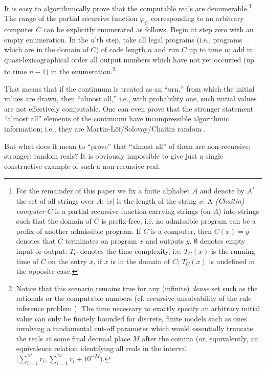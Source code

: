 It is easy to algorithmically prove that the computable reals
are denumerable.\footnote{
For the remainder of this paper we fix a finite
alphabet $A$ and denote by $A^*$ the set of all   strings over $A$;
$|x|$ is the length of the string $x$.
A {\it (Chaitin) computer} $C$ is  a partial recursive function carrying
strings  (on  $A$) into strings such that the domain of
$C$ is prefix-free, i.e. no admissible program can be a prefix of another
admissible program. If $C$ is a  computer, then $C(x)=y$ denotes that
$C$ terminates on program $x$ and outputs $y$. $\emptyset$ denotes
empty input or output.
$T_C$ denotes the
time complexity, i.e.  $T_C(x)$ is the running time of $C$ on the entry
$x$, if
$x$ is in the domain of $C$; $T_C(x)$ is undefined in the opposite
case.}
The range of the partial recursive function $\varphi_C$
corresponding to
an arbitrary computer $C$ can be
explicitly enumerated as follows.
Begin at step zero with an empty enumeration.
In the $n$'th step, take all legal programs
(i.e., programs which are in the domain of $C$)
of code length
$n$ and run $C$ up to time $n$; add
in
quasi-lexicographical order
all output numbers which have not
yet occurred (up to time $n-1$) in the enumeration.\footnote{
Notice that
this scenario
remains true for any (infinite) {\em dense} set such as the rationals or
the
computable numbers (cf. recursive unsolvability of the rule inference
problem \cite{gould}). The
time necessary to exactly specify an arbitrary initial value can only be
finitely bounded for discrete, finite models such as ones involving a
fundamental cut-off parameter which would essentially truncate the reals
at some final decimal place $M$ after the comma (or, equivalently, an
equivalence relation identifying all reals in the interval
$[\sum_{i=1}^M r_i,\sum_{i=1}^{M} r_i+10^{-M})$.
}


That means that if the continuum is treated as an ``urn,'' from
which the initial values are drawn, then ``almost all,'' i.e., with
probability one, such initial values are not effectively computable.
One can even prove that the stronger statement ``almost all'' elements
of the
continuum have incompressible algorithmic information; i.e., they are
Mar\-tin-L\"of\-/So\-lo\-vay/\-Chai\-tin random
\cite{chaitin,calude,vitani}.

But what does it mean to ``prove'' that ``almost all'' of them are
non-recursive; stronger: random reals?
It is obviously impossible to give just a single constructive example of
such a non-recursive real.

